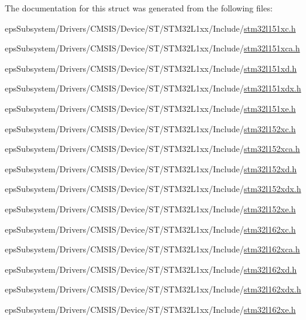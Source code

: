 The documentation for this struct was generated from the following files\-:\begin{DoxyCompactItemize}
\item 
eps\-Subsystem/\-Drivers/\-C\-M\-S\-I\-S/\-Device/\-S\-T/\-S\-T\-M32\-L1xx/\-Include/\hyperlink{stm32l151xc_8h}{stm32l151xc.\-h}\item 
eps\-Subsystem/\-Drivers/\-C\-M\-S\-I\-S/\-Device/\-S\-T/\-S\-T\-M32\-L1xx/\-Include/\hyperlink{stm32l151xca_8h}{stm32l151xca.\-h}\item 
eps\-Subsystem/\-Drivers/\-C\-M\-S\-I\-S/\-Device/\-S\-T/\-S\-T\-M32\-L1xx/\-Include/\hyperlink{stm32l151xd_8h}{stm32l151xd.\-h}\item 
eps\-Subsystem/\-Drivers/\-C\-M\-S\-I\-S/\-Device/\-S\-T/\-S\-T\-M32\-L1xx/\-Include/\hyperlink{stm32l151xdx_8h}{stm32l151xdx.\-h}\item 
eps\-Subsystem/\-Drivers/\-C\-M\-S\-I\-S/\-Device/\-S\-T/\-S\-T\-M32\-L1xx/\-Include/\hyperlink{stm32l151xe_8h}{stm32l151xe.\-h}\item 
eps\-Subsystem/\-Drivers/\-C\-M\-S\-I\-S/\-Device/\-S\-T/\-S\-T\-M32\-L1xx/\-Include/\hyperlink{stm32l152xc_8h}{stm32l152xc.\-h}\item 
eps\-Subsystem/\-Drivers/\-C\-M\-S\-I\-S/\-Device/\-S\-T/\-S\-T\-M32\-L1xx/\-Include/\hyperlink{stm32l152xca_8h}{stm32l152xca.\-h}\item 
eps\-Subsystem/\-Drivers/\-C\-M\-S\-I\-S/\-Device/\-S\-T/\-S\-T\-M32\-L1xx/\-Include/\hyperlink{stm32l152xd_8h}{stm32l152xd.\-h}\item 
eps\-Subsystem/\-Drivers/\-C\-M\-S\-I\-S/\-Device/\-S\-T/\-S\-T\-M32\-L1xx/\-Include/\hyperlink{stm32l152xdx_8h}{stm32l152xdx.\-h}\item 
eps\-Subsystem/\-Drivers/\-C\-M\-S\-I\-S/\-Device/\-S\-T/\-S\-T\-M32\-L1xx/\-Include/\hyperlink{stm32l152xe_8h}{stm32l152xe.\-h}\item 
eps\-Subsystem/\-Drivers/\-C\-M\-S\-I\-S/\-Device/\-S\-T/\-S\-T\-M32\-L1xx/\-Include/\hyperlink{stm32l162xc_8h}{stm32l162xc.\-h}\item 
eps\-Subsystem/\-Drivers/\-C\-M\-S\-I\-S/\-Device/\-S\-T/\-S\-T\-M32\-L1xx/\-Include/\hyperlink{stm32l162xca_8h}{stm32l162xca.\-h}\item 
eps\-Subsystem/\-Drivers/\-C\-M\-S\-I\-S/\-Device/\-S\-T/\-S\-T\-M32\-L1xx/\-Include/\hyperlink{stm32l162xd_8h}{stm32l162xd.\-h}\item 
eps\-Subsystem/\-Drivers/\-C\-M\-S\-I\-S/\-Device/\-S\-T/\-S\-T\-M32\-L1xx/\-Include/\hyperlink{stm32l162xdx_8h}{stm32l162xdx.\-h}\item 
eps\-Subsystem/\-Drivers/\-C\-M\-S\-I\-S/\-Device/\-S\-T/\-S\-T\-M32\-L1xx/\-Include/\hyperlink{stm32l162xe_8h}{stm32l162xe.\-h}\end{DoxyCompactItemize}
